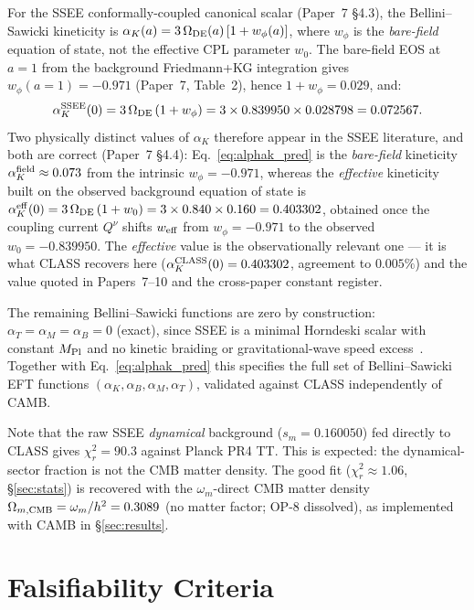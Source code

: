 \documentclass[12pt,a4paper]{article}
\begin{document}
For the SSEE conformally-coupled canonical scalar (Paper~7 \S4.3), the
Bellini--Sawicki kineticity is $\alpha_K(a) = 3\,\Omega_{\rm DE}(a)\,[1+w_\phi(a)]$,
where $w_\phi$ is the \emph{bare-field} equation of state, not the
effective CPL parameter $w_0$.
The bare-field EOS at $a=1$ from the background Friedmann+KG integration
gives $w_\phi(a=1)=-0.971$ (Paper~7, Table~2), hence $1+w_\phi=0.029$, and:
\begin{equation}
  \alpha_K^{\rm SSEE}(0) = 3\,\Omega_{\rm DE}\,(1+w_\phi)
    = 3\times 0.839950\times 0.028798 = 0.072567.
  \label{eq:alphak_pred}
\end{equation}
Two physically distinct values of $\alpha_K$ therefore appear in the SSEE
literature, and both are correct (Paper~7 \S4.4): Eq.~\eqref{eq:alphak_pred}
is the \emph{bare-field} kineticity $\alpha_K^{\rm field}\approx 0.073$ from
the intrinsic $w_\phi=-0.971$, whereas the \emph{effective} kineticity built
on the observed background equation of state is
$\alpha_K^{\rm eff}(0) = 3\,\Omega_{\rm DE}\,(1+w_0) = 3\times 0.840\times 0.160
= 0.403302$, obtained once the coupling current $Q^\nu$ shifts $w_{\rm eff}$
from $w_\phi=-0.971$ to the observed $w_0=-0.839950$. The \emph{effective}
value is the observationally relevant one --- it is what CLASS recovers here
($\alpha_K^{\rm CLASS}(0)=0.403302$, agreement to $0.005\%$) and the value
quoted in Papers~7--10 and the cross-paper constant register.

The remaining Bellini--Sawicki functions are zero by construction:
$\alpha_T=\alpha_M=\alpha_B=0$ (exact), since SSEE is a minimal
Horndeski scalar with constant $M_{\rm Pl}$ and no kinetic braiding
or gravitational-wave speed excess~\citep{GW170817}. Together with
Eq.~\eqref{eq:alphak_pred} this specifies the full set of Bellini--Sawicki EFT
functions $(\alpha_K,\alpha_B,\alpha_M,\alpha_T)$, validated against CLASS independently of CAMB.

Note that the raw SSEE \emph{dynamical} background ($s_m=0.160050$)
fed directly to CLASS gives $\chi^2_r=90.3$ against Planck PR4 TT.
This is expected: the dynamical-sector fraction is not the CMB matter density.
The good fit ($\chi^2_r\approx 1.06$, \S\ref{sec:stats}) is recovered with the
$\omega_m$-direct CMB matter density $\Omega_{m,\rm CMB}=\omega_m/h^2=0.3089$
(no matter factor; OP-8 dissolved), as implemented with CAMB in
\S\ref{sec:results}.

\section{Falsifiability Criteria}
\label{sec:falsifiability}
\end{document}
